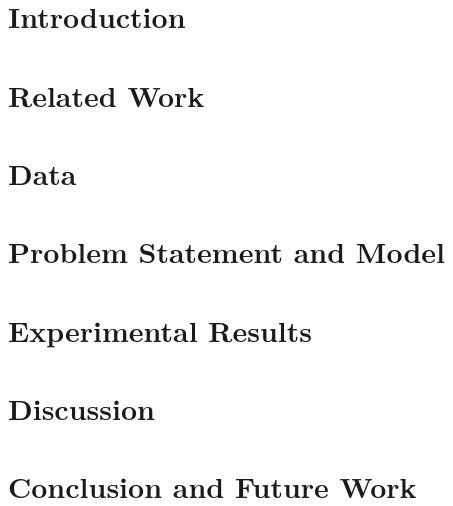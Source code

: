 \documentclass{IEEEtran}
\begin{document}
\begin{abstract}

\end{abstract}

\section{Introduction}
\label{sec:intro}


\section{Related Work}
\label{sec:related}


\section{Data}
\label{sec:data}


\section{Problem Statement and Model}
\label{sec:model}


\section{Experimental Results}
\label{sec:results}



\section{Discussion}
\label{Data:Discussion}


\section{Conclusion and Future Work}
\label{sec:conclusion}




\end{document}
